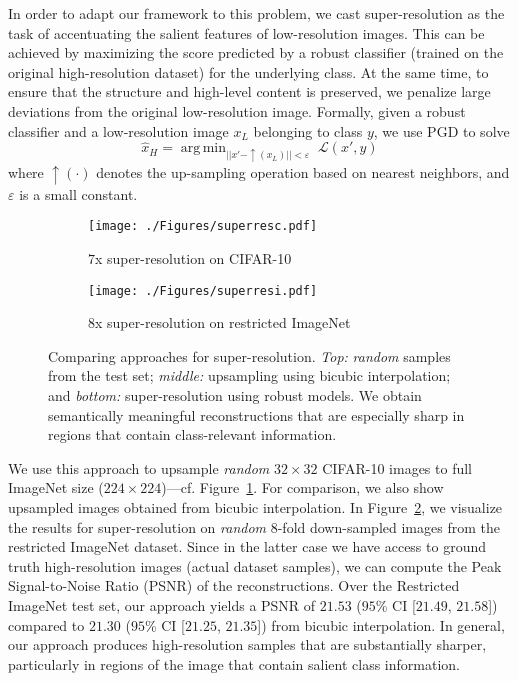 \documentclass{article}
\DeclareMathOperator*{\argmin}{arg\,min}
\newcommand{\eps}{\varepsilon}
\begin{document}
{In order to adapt our framework to this problem,
we cast super-resolution as the task of accentuating the salient
features of low-resolution images.
This can be achieved by maximizing the score predicted by a robust classifier 
(trained on the original high-resolution dataset)
for the underlying class.
At the same time, to ensure that the structure and high-level content is preserved, we penalize
large deviations from the original low-resolution image.
Formally, given a robust classifier
and a low-resolution image $x_L$ belonging to class
$y$, we  use PGD to solve
\begin{equation}
    \hat{x}_H = \argmin_{||x' - \uparrow(x_{L})|| < \eps} \; \mathcal{L}(x', y)
\label{eq:superres}
\end{equation}
where $\uparrow(\cdot)$ denotes the up-sampling operation based on nearest
neighbors, and $\eps$ is a small constant.

\begin{figure}[!h]
	\centering
	\begin{subfigure}[b]{0.495\textwidth}
		\centering
		\texttt{[image: ./Figures/superresc.pdf]}
		\caption{$7$x super-resolution on CIFAR-10}
		\label{fig:superres_cifar}
	\end{subfigure}
	\hfil
	\begin{subfigure}[b]{0.495\textwidth}
		\centering
		\texttt{[image: ./Figures/superresi.pdf]}
		\caption{$8$x super-resolution on restricted ImageNet}
		\label{fig:superres_in}
	\end{subfigure}
	\caption{Comparing approaches for super-resolution. 
		\textit{Top:} \emph{random} samples from the test set;
		\textit{middle:} upsampling using bicubic interpolation; and
		\textit{bottom:} super-resolution using robust models. We obtain 
		semantically meaningful reconstructions that are especially sharp
		in regions that contain class-relevant information.
	}
	\label{fig:superres}
\end{figure}


We use this approach to upsample
\emph{random} $32\times32$ CIFAR-10 images to full ImageNet size ($224 
\times 224$)---cf. Figure~\ref{fig:superres_cifar}. For comparison, we also show upsampled images obtained 
from bicubic interpolation. 
In Figure~\ref{fig:superres_in}, we visualize the results for super-resolution on 
\emph{random} $8$-fold down-sampled images from the restricted 
ImageNet dataset. Since  in the latter case we have access to ground truth 
high-resolution images (actual dataset samples), we can
compute the Peak Signal-to-Noise Ratio (PSNR) of the reconstructions.
Over the Restricted ImageNet 
test set, our approach yields a PSNR of $21.53$ 
($95$\% CI [$21.49$, $21.58$]) compared to
$21.30$ ($95$\% CI [$21.25$, $21.35$]) from bicubic interpolation. 
In general, our approach produces 
high-resolution samples that are substantially sharper, particularly in regions 
of the image that contain salient class information.

}
\end{document}
